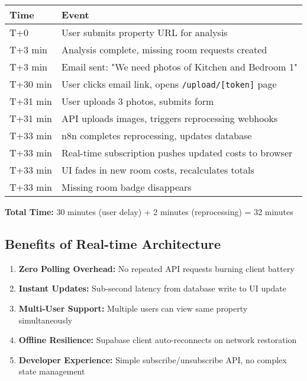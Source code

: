 \documentclass[11pt,a4paper]{article}
\begin{document}
\begin{longtable}{@{}p{2cm}p{12cm}@{}}
\toprule
\textbf{Time} & \textbf{Event} \\
\midrule
T+0 & User submits property URL for analysis \\
T+3 min & Analysis complete, missing room requests created \\
T+3 min & Email sent: "We need photos of Kitchen and Bedroom 1" \\
T+30 min & User clicks email link, opens \texttt{/upload/[token]} page \\
T+31 min & User uploads 3 photos, submits form \\
T+31 min & API uploads images, triggers reprocessing webhooks \\
T+33 min & n8n completes reprocessing, updates database \\
T+33 min & Real-time subscription pushes updated costs to browser \\
T+33 min & UI fades in new room costs, recalculates totals \\
T+33 min & Missing room badge disappears \\
\bottomrule
\end{longtable}

\textbf{Total Time:} 30 minutes (user delay) + 2 minutes (reprocessing) = 32 minutes

\subsection{Benefits of Real-time Architecture}

\begin{enumerate}
  \item \textbf{Zero Polling Overhead:} No repeated API requests burning client battery
  \item \textbf{Instant Updates:} Sub-second latency from database write to UI update
  \item \textbf{Multi-User Support:} Multiple users can view same property simultaneously
  \item \textbf{Offline Resilience:} Supabase client auto-reconnects on network restoration
  \item \textbf{Developer Experience:} Simple subscribe/unsubscribe API, no complex state management
\end{enumerate}

\end{document}
